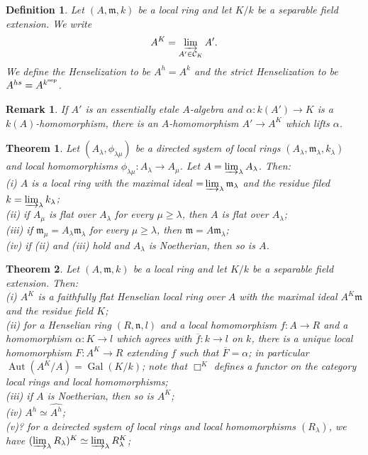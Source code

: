 \documentclass{article}
\theoremstyle{theorem}
\newtheorem*{definition*}{Definition}
\newtheorem{theorem}{Theorem}[section]
\newtheorem{remark}{Remark}[section]
\begin{document}
    \begin{definition*}
        Let $(A, \mathfrak{m}, k)$ be a local ring and let $K/k$ be a separable field extension. We write
        $$A^K = \varinjlim_{A' \in \mathcal{C}_K} A'.$$
        We define the Henselization to be $A^h = A^k$ and the strict Henselization to be $A^{hs} = A^{k^{\rm sep}}$.
    \end{definition*}
    
    \begin{remark}
        If $A'$ is an essentially etale $A$-algebra and $\alpha : k(A') \rightarrow K$ is a $k(A)$-homomorphism, there is an $A$-homomorphism $A' \rightarrow A^K$ which lifts $\alpha$.
    \end{remark}
    
    \begin{theorem}
        Let $(A_\lambda, \phi_{\lambda \mu})$ be a directed system of local rings $(A_\lambda, \mathfrak{m}_\lambda, k_\lambda)$ and local homomorphisms $\phi_{\lambda \mu} : A_\lambda \rightarrow A_\mu$. Let $A = \varinjlim_{\lambda} A_\lambda$. Then: \\
        {\rm (i)} $A$ is a local ring with the maximal ideal $\mathfrak = \varinjlim_{\lambda} \mathfrak{m}_\lambda$ and the residue filed $k = \varinjlim_{\lambda} k_\lambda$;\\
        {\rm (ii)} if $A_\mu$ is flat over $A_\lambda$ for every $\mu \geq \lambda$, then $A$ is flat over $A_\lambda$;\\
        {\rm (iii)} if $\mathfrak{m}_\mu = A_\lambda\mathfrak{m}_\lambda$ for every $\mu \geq \lambda$, then $\mathfrak{m} = A\mathfrak{m}_\lambda$;\\
        {\rm (iv)} if {\rm (ii)} and {\rm (iii)} hold and $A_\lambda$ is Noetherian, then so is $A$.
    \end{theorem}
    
    \begin{theorem}
        Let $(A, \mathfrak{m}, k)$ be a local ring and let $K/k$ be a separable field extension. Then:\\
        {\rm (i)} $A^K$ is a faithfully flat Henselian local ring over $A$ with the maximal ideal $A^K\mathfrak{m}$ and the residue field $K$;\\
        {\rm (ii)} for a Henselian ring $(R, \mathfrak{n}, l)$ and a local homomorphism $f : A \rightarrow R$ and a homomorphism $\alpha : K \rightarrow l$ which agrees with $\overline f : k \rightarrow l$ on $k$, there is a unique local homomorphism $F : A^K \rightarrow R$ extending $f$ such that $\overline F = \alpha$; in particular $\operatorname{Aut}(A^K/A) = \operatorname{Gal}(K/k)$; note that $\Box^K$ defines a functor on the category local rings and local homomorphisms;\\
        {\rm (iii)} if $A$ is Noetherian, then so is $A^K$;\\
        {\rm (iv)} $A^h \simeq \widehat{A^h}$;\\
        {\rm (v)?} for a deirected system of local rings and local homomorphisms $(R_\lambda)$, we have $(\varinjlim_{\lambda} R_\lambda)^K \simeq \varinjlim_{\lambda} R_\lambda^K$;
    \end{theorem}
    
\end{document}
